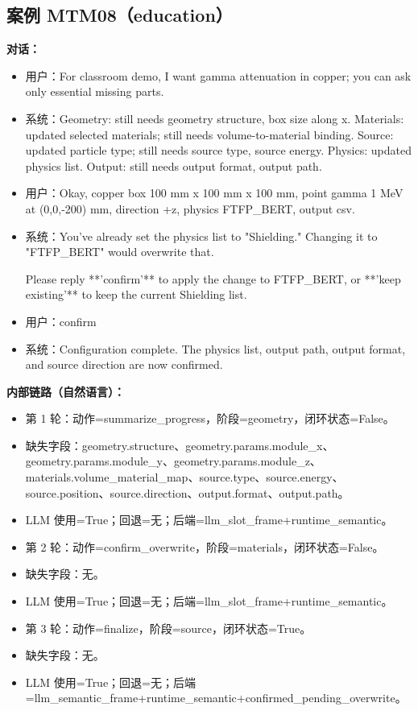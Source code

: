 \documentclass[11pt]{ctexart}
\begin{document}
\subsection{案例 MTM08（education）}
\textbf{对话：}
\begin{itemize}
\item 用户：For classroom demo, I want gamma attenuation in copper; you can ask only essential missing parts.
\item 系统：Geometry: still needs geometry structure, box size along x. Materials: updated selected materials; still needs volume-to-material binding. Source: updated particle type; still needs source type, source energy. Physics: updated physics list. Output: still needs output format, output path.
\item 用户：Okay, copper box 100 mm x 100 mm x 100 mm, point gamma 1 MeV at (0,0,-200) mm, direction +z, physics FTFP\_BERT, output csv.
\item 系统：You've already set the physics list to "Shielding." Changing it to "FTFP\_BERT" would overwrite that.

Please reply **'confirm'** to apply the change to FTFP\_BERT, or **'keep existing'** to keep the current Shielding list.
\item 用户：confirm
\item 系统：Configuration complete. The physics list, output path, output format, and source direction are now confirmed.
\end{itemize}
\textbf{内部链路（自然语言）：}
\begin{itemize}
\item 第 1 轮：动作=summarize\_progress，阶段=geometry，闭环状态=False。
\item 缺失字段：geometry.structure、geometry.params.module\_x、geometry.params.module\_y、geometry.params.module\_z、materials.volume\_material\_map、source.type、source.energy、source.position、source.direction、output.format、output.path。
\item LLM 使用=True；回退=无；后端=llm\_slot\_frame+runtime\_semantic。
\item 第 2 轮：动作=confirm\_overwrite，阶段=materials，闭环状态=False。
\item 缺失字段：无。
\item LLM 使用=True；回退=无；后端=llm\_slot\_frame+runtime\_semantic。
\item 第 3 轮：动作=finalize，阶段=source，闭环状态=True。
\item 缺失字段：无。
\item LLM 使用=True；回退=无；后端=llm\_semantic\_frame+runtime\_semantic+confirmed\_pending\_overwrite。
\end{itemize}
\end{document}
